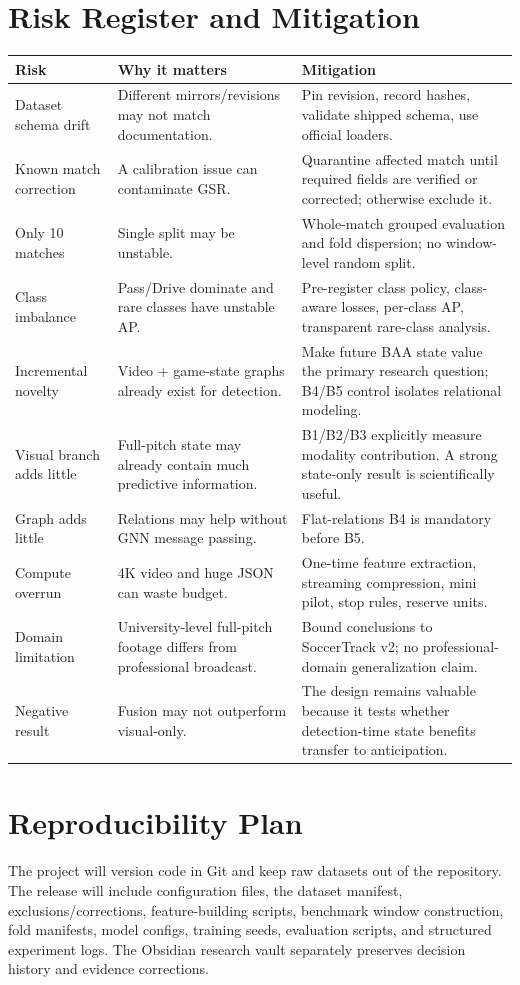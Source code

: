\documentclass[11pt,a4paper]{article}
\begin{document}
\section{Risk Register and Mitigation}
\begin{longtable}{p{3.2cm}p{5.0cm}p{6.0cm}}
\toprule
\textbf{Risk} & \textbf{Why it matters} & \textbf{Mitigation} \\
\midrule
Dataset schema drift & Different mirrors/revisions may not match documentation. & Pin revision, record hashes, validate shipped schema, use official loaders. \\
Known match correction & A calibration issue can contaminate GSR. & Quarantine affected match until required fields are verified or corrected; otherwise exclude it. \\
Only 10 matches & Single split may be unstable. & Whole-match grouped evaluation and fold dispersion; no window-level random split. \\
Class imbalance & Pass/Drive dominate and rare classes have unstable AP. & Pre-register class policy, class-aware losses, per-class AP, transparent rare-class analysis. \\
Incremental novelty & Video + game-state graphs already exist for detection. & Make future BAA state value the primary research question; B4/B5 control isolates relational modeling. \\
Visual branch adds little & Full-pitch state may already contain much predictive information. & B1/B2/B3 explicitly measure modality contribution. A strong state-only result is scientifically useful. \\
Graph adds little & Relations may help without GNN message passing. & Flat-relations B4 is mandatory before B5. \\
Compute overrun & 4K video and huge JSON can waste budget. & One-time feature extraction, streaming compression, mini pilot, stop rules, reserve units. \\
Domain limitation & University-level full-pitch footage differs from professional broadcast. & Bound conclusions to SoccerTrack v2; no professional-domain generalization claim. \\
Negative result & Fusion may not outperform visual-only. & The design remains valuable because it tests whether detection-time state benefits transfer to anticipation. \\
\bottomrule
\end{longtable}

\section{Reproducibility Plan}
The project will version code in Git and keep raw datasets out of the repository. The release will include configuration files, the dataset manifest, exclusions/corrections, feature-building scripts, benchmark window construction, fold manifests, model configs, training seeds, evaluation scripts, and structured experiment logs. The Obsidian research vault separately preserves decision history and evidence corrections.
\end{document}
